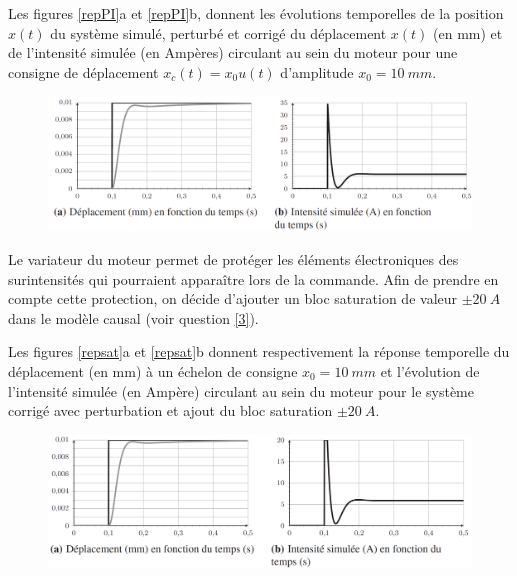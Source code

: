 \medskip
Les figures \ref{repPI}a et \ref{repPI}b, donnent les évolutions temporelles de la position $x(t)$ du système simulé, perturbé et corrigé du déplacement $x(t)$ (en mm) et de l'intensité simulée (en Ampères) circulant au sein du moteur pour une consigne de déplacement $x_c(t)=x_0 u(t)$ d'amplitude $x_0 = \SI{10}{mm}$.

\begin{figure}[!h]\centering
\includegraphics[width=\linewidth]{img/repindPI}
\end{figure}

Le variateur du moteur permet de protéger les éléments électroniques des surintensités qui pourraient apparaître lors de la commande. Afin de prendre en compte cette protection, on décide d'ajouter un bloc saturation de valeur $\pm \SI{20}{A}$ dans le modèle causal (voir question \ref{3}).



\medskip
Les figures \ref{repsat}a et \ref{repsat}b donnent respectivement la réponse temporelle du déplacement (en mm) à un échelon de consigne $x_0 = \SI{10}{mm}$ et l'évolution de l'intensité simulée (en Ampère) circulant au sein du moteur pour le système corrigé avec perturbation et ajout du bloc saturation $\pm \SI{20}{A}$.

\begin{figure}[!h]\centering
\includegraphics[width=\linewidth]{img/repindPIsat}
\end{figure}

